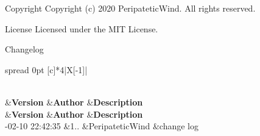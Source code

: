  \begin{DoxyCopyright}{Copyright}
Copyright (c) 2020 Peripatetic\+Wind. All rights reserved. 
\end{DoxyCopyright}
\begin{DoxyParagraph}{License}
Licensed under the M\+IT License. 
\end{DoxyParagraph}
\begin{DoxyParagraph}{Changelog}

\tabulinesep=1mm
\begin{longtabu} spread 0pt [c]{*4{|X[-1]}|}
\caption{Change Log}\label{_}\\
\hline
{}&{\bf Version }&{\bf Author }&{\bf Description }\\
\endfirsthead
\hline
\endfoot
\hline
{}&{\bf Version }&{\bf Author }&{\bf Description }\\
-\/02-\/10 22\+:42\+:35 &1.. &Peripatetic\+Wind &change log \\
\end{longtabu}

\end{DoxyParagraph}
